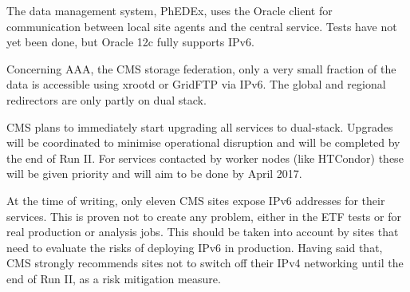 \documentclass[11pt]{article}
\begin{document}
The data management system, PhEDEx, uses the Oracle client for communication between local site agents and the central service. Tests
have not yet been done, but Oracle 12c fully supports IPv6.

Concerning AAA, the CMS storage federation, only a very small fraction of the data is accessible using xrootd or GridFTP via IPv6. The global and regional redirectors are only partly on dual stack.

CMS plans to immediately start upgrading all services to dual-stack.  Upgrades will be coordinated to minimise operational disruption and will be completed by the end of Run II.  For services contacted by worker nodes (like HTCondor) these will be given priority and will aim to be done by April 2017. 

At the time of writing, only eleven CMS sites expose IPv6 addresses for their services. This is proven not to create any problem, either in the ETF tests or for real production or analysis jobs. This should be taken into account by sites that need to evaluate the risks of deploying IPv6 in production.  Having said that, CMS strongly recommends sites not to switch off their IPv4 networking until the end of Run II, as a risk mitigation measure.




\end{document}

